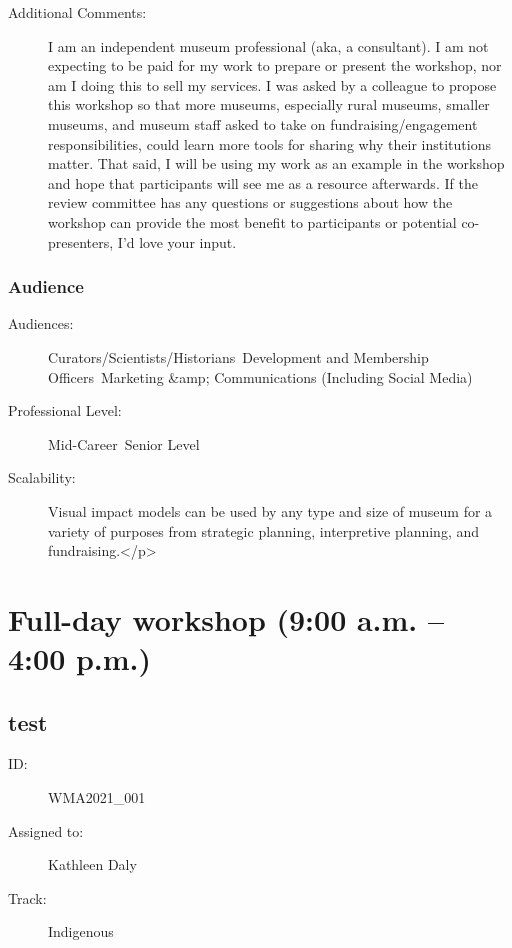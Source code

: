 \documentclass{report}
\begin{document}
\begin{description}
                    \item [Additional Comments: ]I am an independent museum professional (aka, a consultant). I am not expecting to be paid for my work to prepare or present the workshop, nor am I doing this to sell my services. I was asked by a colleague to propose this workshop so that more museums, especially rural museums, smaller museums, and museum staff asked to take on fundraising/engagement responsibilities, could learn more tools for sharing why their institutions matter. That said, I will be using my work as an example in the workshop and hope that participants will see me as a resource afterwards. If the review committee has any questions or suggestions about how the workshop can provide the most benefit to participants or potential co-presenters, I’d love your input.

                \end{description}
              \subsection*{Audience}
                \begin{description}
                  \item [Audiences:]Curators/Scientists/Historians~Development and Membership Officers~Marketing &amp; Communications (Including Social Media)~
                  \item[Professional Level:]Mid-Career~Senior Level~
                \item[Scalability:] Visual impact models can be used by any type and size of museum for a variety of purposes from strategic planning, interpretive planning, and fundraising.</p>
							
              \end{description}




    
  

  
    \newpage
    \chapter*{ Full-day workshop (9:00 a.m. – 4:00 p.m.) }

      
        
  
        
          \newpage
          \section{ test }
            \begin{description}
              \item [ID:]
              WMA2021\_001

              \item [Assigned to:]Kathleen Daly~
                \item [Track:]Indigenous~
              \end{description}
\end{document}
